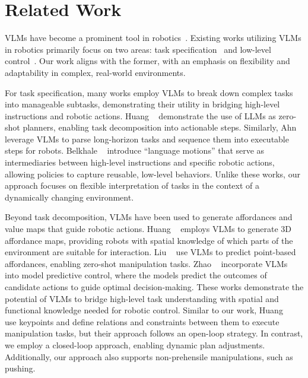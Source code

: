 \section{Related Work}
 VLMs have become a prominent tool in robotics~\cite{ahn2022can,codeaspolicies2022,huang2023voxposer,brohan2022rt,brohan2023rt,liu2024moka,huang2024copa,team2024octo,huang2023instruct2act,xu2023creative,zhou2023generalizable,nasiriany2024pivot,di2024keypoint,zeng2023large,zha2024distilling,arenas2024prompt,mahadevan2024generative,liang2024learning,huang2024grounded,ren2023robots,jiang2022vima,yang2024guiding,duan2024aha,duan2024manipulate,yuan2024robopoint,singh2023progprompt,tang2024kalie,liang2024eurekaverse,zawalski2024robotic}. Existing works utilizing VLMs in robotics primarily focus on two areas: task specification~\cite{ahn2022can,codeaspolicies2022,huang2023voxposer,liu2024moka,huang2024copa,nasiriany2024pivot} and low-level control~\cite{brohan2022rt,brohan2023rt,o2023open,codeaspolicies2022}. Our work aligns with the former, with an emphasis on flexibility and adaptability in complex, real-world environments.

For task specification, many works employ VLMs to break down complex tasks into manageable subtasks, demonstrating their utility in bridging high-level instructions and robotic actions. Huang \etal~\cite{huang2022language} demonstrate the use of LLMs as zero-shot planners, enabling task decomposition into actionable steps. Similarly, Ahn \etal~\cite{ahn2022can} leverage VLMs to parse long-horizon tasks and sequence them into executable steps for robots. Belkhale \etal~\cite{rth2024arxiv} introduce ``language motions'' that serve as intermediaries between high-level instructions and specific robotic actions, allowing policies to capture reusable, low-level behaviors.  Unlike these works, our approach focuses on flexible interpretation of tasks in the context of a dynamically changing environment. 
 

Beyond task decomposition, VLMs have been used to generate affordances and value maps that guide robotic actions. Huang \etal~\cite{huang2023voxposer} employs VLMs to generate 3D affordance maps, providing robots with spatial knowledge of which parts of the environment are suitable for interaction. Liu \etal~\cite{liu2024moka} use VLMs to predict point-based affordances, enabling zero-shot manipulation tasks. Zhao \etal~\cite{zhao2024vlmpc} incorporate VLMs into model predictive control, where the models predict the outcomes of candidate actions to guide optimal decision-making. These works demonstrate the potential of VLMs to bridge high-level task understanding with spatial and functional knowledge needed for robotic control. Similar to our work, Huang \etal~\cite{huang2024rekep} use keypoints and define relations and constraints between them to execute manipulation tasks, but their approach follows an open-loop strategy. In contrast, we employ a closed-loop approach, enabling dynamic plan adjustments. Additionally, our approach also supports non-prehensile manipulations, such as pushing.


